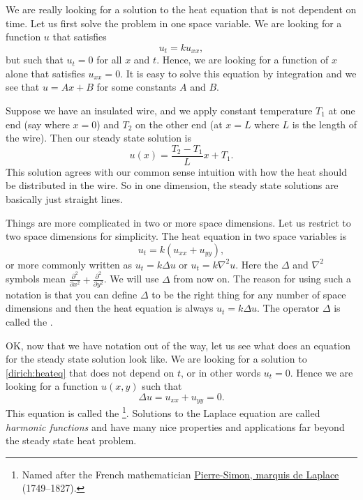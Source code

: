 \documentclass[12pt]{book}
\begin{document}
We are really looking for a solution to the heat equation that is not
dependent on time.  Let us first solve the problem in one space variable.  We are
looking for a function $u$ that satisfies
\begin{equation*}
u_t = k u_{xx} ,
\end{equation*}
but such that $u_t = 0$ for all $x$ and $t$.  Hence, we are looking for a
function of $x$ alone that satisfies $u_{xx} = 0$.  It is easy to solve this
equation by integration and we see that $u = Ax+B$ for some constants $A$ and
$B$.

Suppose we have an insulated wire, and we apply constant temperature $T_1$
at one end (say where $x=0$) and $T_2$ on the other end (at $x=L$ where $L$
is the length of the wire).  Then our steady state solution is
\begin{equation*}
u(x) = \frac{T_2-T_1}{L} x + T_1 .
\end{equation*}
This solution agrees with our common sense intuition with how the heat should be
distributed in the wire.  So in one dimension, the steady state solutions
are basically just straight lines.

Things are more complicated in two or more space dimensions.  Let us
restrict to two space dimensions for simplicity.  The heat equation in two
space variables is
\begin{equation} \label{dirich:heateq}
u_t = k(u_{xx} + u_{yy}) ,
\end{equation}
or more commonly written as
$u_t = k \Delta u$ or
$u_t = k \nabla^2 u$.  Here the $\Delta$ and $\nabla^2$ symbols
mean $\frac{\partial^2}{\partial x^2} +
\frac{\partial^2}{\partial y^2}$.  We will use $\Delta$
from now on.  The reason for using such a notation is that you
can define $\Delta$ to be the right thing for any number of space
dimensions and then the heat equation is always
$u_t = k \Delta u$.  The operator $\Delta$ is called the \emph{}.

OK, now that we have notation out of the way, let us see what does an equation
for the steady state solution look like.  We are looking for a solution to
\eqref{dirich:heateq} that does not depend on $t$, or in other words $u_t =
0$.  Hence we are looking for a
function $u(x,y)$ such that
\begin{equation*}
\boxed{~~
\Delta u = 
u_{xx} + u_{yy} = 0 .
~~}
\end{equation*}
This equation is called the \emph{}%
\footnote{Named after the French mathematician
\href{http://en.wikipedia.org/wiki/Laplace}{Pierre-Simon, marquis de Laplace}
(1749--1827).}.
Solutions to the Laplace equation
are called \emph{harmonic functions}
and have many nice properties and
applications far beyond the steady state heat problem.
\end{document}
